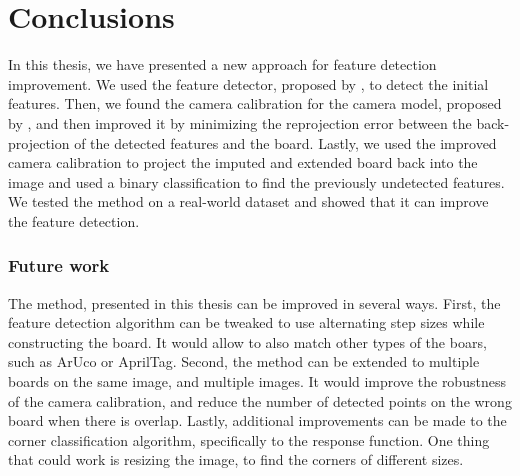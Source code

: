 \chapter{Conclusions}\label{cha:conclusions}

In this thesis, we have presented a new approach for feature detection
improvement. We used the feature detector, proposed by
\cite{geigerAutomaticCameraRange2012}, to detect the initial features. Then, we
found the camera calibration for the camera model, proposed by
\cite{scaramuzzaToolboxEasilyCalibrating2006}, and then improved it by
minimizing the reprojection error between the back-projection of the detected
features and the board. Lastly, we used the improved camera calibration to
project the imputed and extended board back into the image and used a binary
classification to find the previously undetected features. We tested the method
on a real-world dataset and showed that it can improve the feature detection.

\subsection{Future work}\label{sub:future_work}

The method, presented in this thesis can be improved in several ways. First, the
feature detection algorithm can be tweaked to use alternating step sizes while
constructing the board. It would allow to also match other types of the boars,
such as ArUco or AprilTag. Second, the method can be extended to multiple boards
on the same image, and multiple images. It would improve the robustness of the
camera calibration, and reduce the number of detected points on the wrong board
when there is overlap. Lastly, additional improvements can be made to the corner
classification algorithm, specifically to the response function. One thing that
could work is resizing the image, to find the corners of different sizes.

